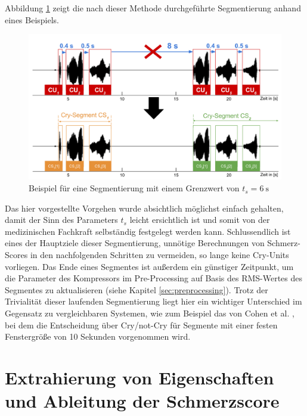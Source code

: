 Abbildung \ref{img:segmenting06} zeigt die nach dieser Methode durchgeführte Segmentierung anhand eines Beispiels.

\begin{figure}[h]
	\centering
	\includegraphics[width=1\textwidth]{bilder/segmentierung06.png}
	\caption{Beispiel für eine Segmentierung mit einem Grenzwert von $t_s = \SI{6}{\second}$}
	\label{img:segmenting06}
\end{figure}

Das hier vorgestellte Vorgehen wurde absichtlich möglichst einfach gehalten, damit der Sinn des Parameters $t_{s}$ leicht ersichtlich ist und somit von der medizinischen Fachkraft selbständig festgelegt werden kann. Schlussendlich ist eines der Hauptziele dieser Segmentierung, unnötige Berechnungen von Schmerz-Scores in den nachfolgenden Schritten zu vermeiden, so lange keine Cry-Units vorliegen. Das Ende eines Segmentes ist außerdem ein günstiger Zeitpunkt, um die Parameter des Kompressors im Pre-Processing auf Basis des RMS-Wertes des Segmentes zu aktualisieren (siehe Kapitel \ref{sec:preprocessing}). Trotz der Trivialität dieser laufenden Segmentierung liegt hier ein wichtiger Unterschied im Gegensatz zu vergleichbaren Systemen, wie zum Beispiel das von Cohen et al. \cite{cohenCry}, bei dem die Entscheidung über Cry/not-Cry für Segmente mit einer festen Fenstergröße von 10 Sekunden vorgenommen wird. 

\section{Extrahierung von Eigenschaften und Ableitung der Schmerzscore}
\label{sec:overviewPainRegression}

